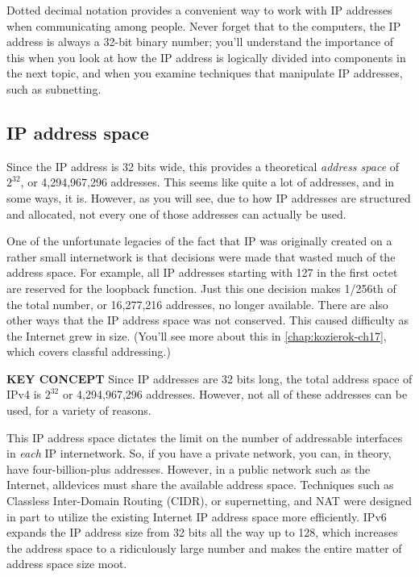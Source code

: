 \documentclass[b5paper,11pt]{memoir}
\begin{document}
Dotted decimal notation provides a convenient way to work with
\protect\hypertarget{ch16s02.htmlux5cux23idx-CHP-16-0658}{}{}IP
addresses when communicating among people. Never forget that to the
computers, the IP address is always a 32-bit
\protect\hypertarget{ch16s02.htmlux5cux23idx-CHP-16-0659}{}{}binary
number; you'll understand the importance of this when you look at how
the IP address is logically divided into components in the next topic,
and when you examine techniques that manipulate IP addresses, such as
subnetting.



\subsection{IP address space}

Since the IP address is 32 bits wide, this provides a theoretical {\emph{address
space}} of $2^{32}$, or 4,294,967,296 addresses.
This seems like quite a lot of addresses, and in some ways, it is.
However, as you will see, due to how IP addresses are structured and allocated, not every one of those addresses can actually be used.

One of the unfortunate legacies of the fact that IP was originally
created on a rather small internetwork is that decisions were made that
wasted much of the address space. For example, all IP addresses starting
with 127 in the first octet are reserved for the loopback function. Just
this one decision makes 1/256th of the total number, or 16,277,216
addresses, no longer available. There are also other ways that the IP
address space was not conserved. This caused difficulty as the Internet
grew in size. (You'll see more about this in \vref{chap:kozierok-ch17}, which covers classful addressing.)


{\textbf{KEY CONCEPT}} Since IP addresses are 32 bits long, the total
address space of IPv4 is $2^{32}$ or 4,294,967,296 addresses.
However, not all of these addresses can be used, for a variety of reasons.

This IP address space dictates the limit on the number of addressable
interfaces in {\emph{each}} IP internetwork. So, if you have a private
network, you can, in theory, have four-billion-plus addresses. However,
in a public network such as the Internet, alldevices must share the
available address space. Techniques such as Classless Inter-Domain
Routing (CIDR), or supernetting, and NAT were designed in part to
utilize the existing Internet IP address space more efficiently. IPv6
expands the IP address size from 32 bits all the way up to 128, which
increases the address space to a ridiculously large number and makes the
entire matter of address space size moot.
\end{document}
